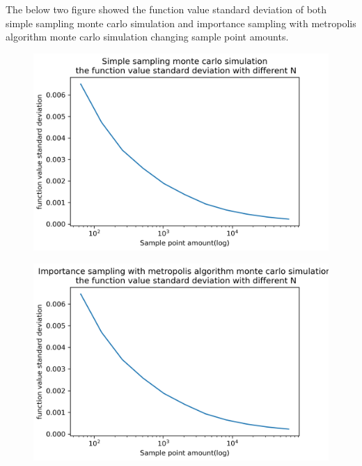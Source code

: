\documentclass{article}
\begin{document}
	The below two figure showed the function value standard deviation of both simple sampling monte carlo simulation and importance sampling with metropolis algorithm monte carlo simulation changing sample point amounts.
	\begin{figure}[hb!]
		\centering
		\includegraphics[width=\linewidth]{notebook/ss_std}
	\end{figure}
	\begin{figure}[hb!]
		\centering
		\includegraphics[width=\linewidth]{notebook/mis_std}
	\end{figure}
\end{document}
